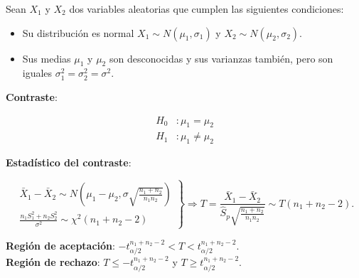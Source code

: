 \documentclass[
  spanish,
  a4paper,
]{scrreport}
\providecommand{\tightlist}{%
  \setlength{\itemsep}{0pt}\setlength{\parskip}{0pt}}
\theoremstyle{plain}
\theoremstyle{definition}
\theoremstyle{definition}
\theoremstyle{remark}
\begin{document}
Sean \(X_1\) y \(X_2\) dos variables aleatorias que cumplen las
siguientes condiciones:

\begin{itemize}
\tightlist
\item
  Su distribución es normal \(X_1\sim N(\mu_1,\sigma_1)\) y
  \(X_2\sim N(\mu_2,\sigma_2)\).
\item
  Sus medias \(\mu_1\) y \(\mu_2\) son desconocidas y sus varianzas
  también, pero son iguales \(\sigma^2_1=\sigma^2_2=\sigma^2\).
\end{itemize}

\textbf{Contraste}:

\begin{align*}
H_0 &: \mu_1=\mu_2 \\
H_1 &: \mu_1\neq \mu_2
\end{align*}

\textbf{Estadístico del contraste}:

\[
\left.
\begin{array}{l}
\bar{X}_1-\bar{X}_2\sim N\left(\mu_1-\mu_2,\sigma\sqrt{\frac{n_1+n_2}{n_1n_2}} \right) \\
\displaystyle \frac{n_1S_1^2+n_2S_2^2}{\sigma^2} \sim \chi^2(n_1+n_2-2)
\end{array}
\right\}
\Rightarrow
T=\frac{\bar{X}_1-\bar{X}_2}{\hat{S}_p\sqrt{\frac{n_1+n_2}{n_1n_2}}} \sim T(n_1+n_2-2).
\]

\textbf{Región de aceptación}:
\(-t_{\alpha/2}^{n_1+n_2-2} < T < t_{\alpha/2}^{n_1+n_2-2}\).\\
\textbf{Región de rechazo}: \(T\leq -t_{\alpha/2}^{n_1+n_2-2}\) y
\(T\geq t_{\alpha/2}^{n_1+n_2-2}\).
\end{document}
